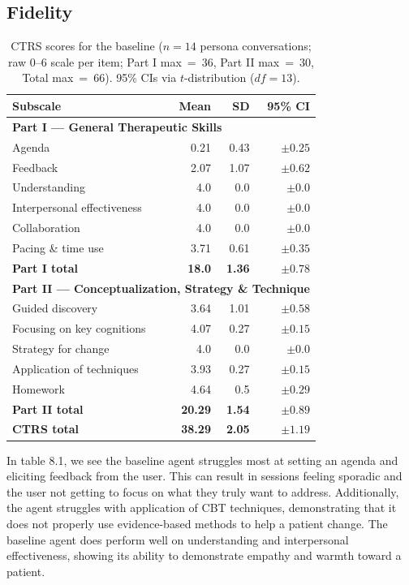 \documentclass[twoside]{report}
\begin{document}
\subsection{Fidelity}
\begin{table}[ht]
\centering
\caption{CTRS scores for the baseline ($n = 14$ persona conversations; raw 0--6 scale per item; Part I max~=~36, Part II max~=~30, Total max~=~66). 95\% CIs via $t$-distribution ($df = 13$).}
\label{tab:ctrs_4c025580}
\begin{tabular}{|l|r|r|r|}
\hline
\textbf{Subscale} & \textbf{Mean} & \textbf{SD} & \textbf{95\% CI} \\
\hline
\hline
\multicolumn{4}{|l|}{\textbf{Part I --- General Therapeutic Skills}} \\
\hline
Agenda & 0.21 & 0.43 & $\pm 0.25$ \\
\hline
Feedback & 2.07 & 1.07 & $\pm 0.62$ \\
\hline
Understanding & 4.0 & 0.0 & $\pm 0.0$ \\
\hline
Interpersonal effectiveness & 4.0 & 0.0 & $\pm 0.0$ \\
\hline
Collaboration & 4.0 & 0.0 & $\pm 0.0$ \\
\hline
Pacing \& time use & 3.71 & 0.61 & $\pm 0.35$ \\
\hline
\textbf{Part I total} & \textbf{18.0} & \textbf{1.36} & $\mathbf{\pm 0.78}$ \\
\hline
\hline
\multicolumn{4}{|l|}{\textbf{Part II --- Conceptualization, Strategy \& Technique}} \\
\hline
Guided discovery & 3.64 & 1.01 & $\pm 0.58$ \\
\hline
Focusing on key cognitions & 4.07 & 0.27 & $\pm 0.15$ \\
\hline
Strategy for change & 4.0 & 0.0 & $\pm 0.0$ \\
\hline
Application of techniques & 3.93 & 0.27 & $\pm 0.15$ \\
\hline
Homework & 4.64 & 0.5 & $\pm 0.29$ \\
\hline
\textbf{Part II total} & \textbf{20.29} & \textbf{1.54} & $\mathbf{\pm 0.89}$ \\
\hline
\hline
\textbf{CTRS total} & \textbf{38.29} & \textbf{2.05} & $\mathbf{\pm 1.19}$ \\
\hline
\end{tabular}
\end{table}

In table 8.1, we see the baseline agent struggles most at setting an agenda and eliciting feedback from the user. This can result in sessions feeling sporadic and the user not getting to focus on what they truly want to address. Additionally, the agent struggles with application of CBT techniques, demonstrating that it does not properly use evidence-based methods to help a patient change. The baseline agent does perform well on understanding and interpersonal effectiveness, showing its ability to demonstrate empathy and warmth toward a patient.
\end{document}
